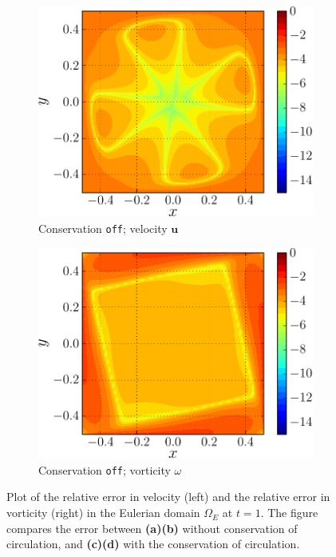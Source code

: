 \begin{figure}[!p]
     \begin{subfigure}[t]{0.45\textwidth}
             \includegraphics[width=\linewidth]{./figures/hybrid/lambOseent2/lambOseen_fullyCoff_vErrorFinal_compressed-crop.pdf}
             \caption{Conservation \texttt{off}; velocity $\mathbf{u}$}
             \label{fig:lambOseen_fullyCoff_vErrorFinal}
     \end{subfigure}
     \qquad     
     \begin{subfigure}[t]{0.45\textwidth}
             \includegraphics[width=\linewidth]{./figures/hybrid/lambOseent2/lambOseen_fullyCoff_wErrorFinal_compressed-crop.pdf}
             \caption{Conservation \texttt{off}; vorticity $\omega$}
             \label{fig:lambOseen_fullyCoff_wErrorFinal}
     \end{subfigure}  
  
     \caption{Plot of the relative error in velocity (left) and the relative error in vorticity (right) in the Eulerian domain $\Omega_E$ at $t=1$. The figure compares the error between \textbf{(a)}\textbf{(b)} without conservation of circulation, and \textbf{(c)}\textbf{(d)} with the conservation of circulation.}
     \label{fig:lambOseen_conservation_contourf}
	\end{figure}
	
